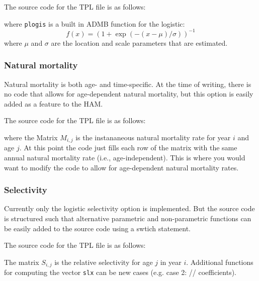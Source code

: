 \documentclass[12pt,letterpaper]{article}
\newcommand{\ham}{HAM}
\begin{document}
       The source code for the TPL file is as follows:
      
      where \texttt{plogis} is a built in ADMB function for the logistic: \[f(x) =  (1+\exp(-(x-\mu)/\sigma))^{-1} \] where $\mu$ and $\sigma$ are the location and scale parameters that are estimated.
    

    \subsubsection{Natural mortality} %
    \label{ssub:natural_mortality}
    
      Natural mortality is both age- and time-specific.  At the time of writing, there is no code that allows for age-dependent natural mortality, but this option is easily added as a feature to the \ham.

      The source code for the TPL file is as follows:
      
      where the Matrix $M_{i,j}$ is the instananeous natural mortality rate for year $i$ and age $j$.  At this point the code just fills each row of the matrix with the same annual natural mortality rate (i.e., age-independent).  This is where you would want to modify the code to allow for age-dependent natural mortality rates.

    \subsubsection{Selectivity} %
    \label{ssub:selectivity}
      Currently only the logistic selectivity option is implemented. But the source code is structured such that alternative parametric and non-parametric functions can be easily added to the source code using a swtich statement.

       The source code for the TPL file is as follows:
      

      The matrix $S_{i,j}$ is the relative selectivity for age $j$ in year $i$.  Additional functions for computing the vector \texttt{slx} can be new cases (e.g. case 2:  // coefficients).
\end{document}
